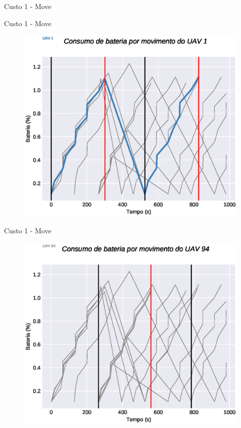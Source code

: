 \begin{frame}{Custo 1 - Move}
\begin{figure}[!htb]
                 \end{figure}
            \end{frame}\begin{frame}{Custo 1 - Move}
                \begin{figure}[!htb]
                     \includegraphics[width=\textwidth]{custo_1/uav_move_acum_uav_1.eps}
                 \end{figure}
            \end{frame}\begin{frame}{Custo 1 - Move}
                \begin{figure}[!htb]
                     \includegraphics[width=\textwidth]{custo_1/uav_move_acum_uav_8.eps}

\end{figure}
\end{frame}

